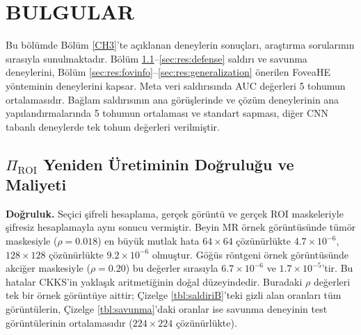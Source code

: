 \chapter{BULGULAR}\label{CH4}

Bu bölümde Bölüm \ref{CH3}'te açıklanan deneylerin sonuçları, araştırma sorularının sırasıyla sunulmaktadır. Bölüm \ref{sec:res:piroi}--\ref{sec:res:defense} saldırı ve savunma deneylerini, Bölüm \ref{sec:res:fovinfo}--\ref{sec:res:generalization} önerilen FoveaHE yönteminin deneylerini kapsar. Meta veri saldırısında AUC değerleri 5 tohumun ortalamasıdır. Bağlam saldırısının ana görüşlerinde ve çözüm deneylerinin ana yapılandırmalarında 5 tohumun ortalaması ve standart sapması, diğer CNN tabanlı deneylerde tek tohum değerleri verilmiştir.

\section{$\Pi_{\mathrm{ROI}}$ Yeniden Üretiminin Doğruluğu ve Maliyeti}\label{sec:res:piroi}

\textbf{Doğruluk.} Seçici şifreli hesaplama, gerçek görüntü ve gerçek ROI maskeleriyle şifresiz hesaplamayla aynı sonucu vermiştir. Beyin MR örnek görüntüsünde tümör maskesiyle ($\rho = 0.018$) en büyük mutlak hata $64 \times 64$ çözünürlükte $4.7 \times 10^{-6}$, $128 \times 128$ çözünürlükte $9.2 \times 10^{-6}$ olmuştur. Göğüs röntgeni örnek görüntüsünde akciğer maskesiyle ($\rho = 0.20$) bu değerler sırasıyla $6.7 \times 10^{-6}$ ve $1.7 \times 10^{-5}$'tir. Bu hatalar CKKS'in yaklaşık aritmetiğinin doğal düzeyindedir. Buradaki $\rho$ değerleri tek bir örnek görüntüye aittir; Çizelge \ref{tbl:saldiriB}'teki gizli alan oranları tüm görüntülerin, Çizelge \ref{tbl:savunma}'daki oranlar ise savunma deneyinin test görüntülerinin ortalamasıdır ($224 \times 224$ çözünürlükte).


